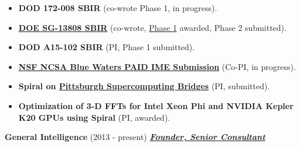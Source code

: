 \documentclass{article}
\newcommand{\employer}[3]{{ \textbf{#1} (#2) \underline{\textbf{\emph{#3}}}\\  }}
\begin{document}
\begin{itemize}
\begin{itemize}
          \item \textbf{DOD 172-008 SBIR} (co-wrote Phase 1, in progress).

          \item \textbf{\href{http://science.energy.gov/sbir/}{DOE SG-13808 SBIR}} (co-wrote, \href{https://www.osti.gov/scitech/servlets/purl/1242462}{Phase 1} awarded, Phase 2 submitted).

          \item \textbf{DOD A15-102 SBIR} (PI, Phase 1 submitted).

          \item \textbf{\href{https://bluewaters.ncsa.illinois.edu/paid-ime-submissions}{NSF NCSA Blue Waters PAID IME Submission}} (Co-PI, in progress).

          \item \textbf{Spiral on \href{http://www.psc.edu/index.php/bridges}{Pittsburgh Supercomputing Bridges}} (PI, submitted). 

          \item \textbf{Optimization of 3-D FFTs for Intel Xeon Phi and NVIDIA Kepler K20 GPUs using Spiral} (PI, awarded).

        \end{itemize}


    \end{itemize}


\employer{General Intelligence}{2013 - present}{Founder, Senior Consultant}
\end{document}
